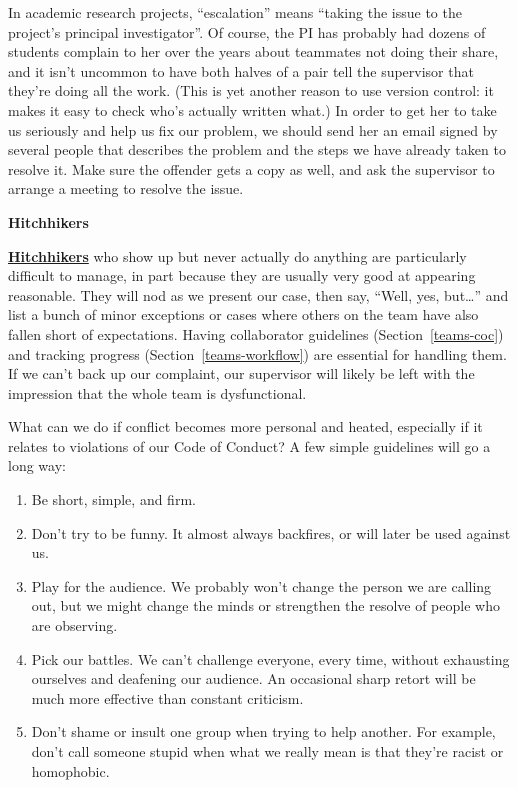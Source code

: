 \documentclass[
]{krantz}
\renewenvironment{quote}{\begin{VF}}{\end{VF}}
\newcommand{\gref}[2]{\hyperlink{#2}{\textbf{#1}}}
\begin{document}
In academic research projects,
``escalation'' means ``taking the issue to the project's principal investigator''.
Of course,
the PI has probably had dozens of students complain to her over the years
about teammates not doing their share,
and it isn't uncommon to have both halves of a pair tell the supervisor that they're doing all the work.
(This is yet another reason to use version control:
it makes it easy to check who's actually written what.)
In order to get her to take us seriously and help us fix our problem,
we should send her an email signed by several people
that describes the problem and the steps we have already taken to resolve it.
Make sure the offender gets a copy as well,
and ask the supervisor to arrange a meeting to resolve the issue.

\begin{quote}
\textbf{Hitchhikers}

\gref{Hitchhikers}{hitchhiker} who show up but never actually do anything
are particularly difficult to manage,
in part because they are usually very good at appearing reasonable.
They will nod as we present our case,
then say, ``Well, yes, but\ldots{}'' and list a bunch of minor exceptions
or cases where others on the team have also fallen short of expectations.
Having collaborator guidelines (Section~\ref{teams-coc})
and tracking progress (Section~\ref{teams-workflow})
are essential for handling them.
If we can't back up our complaint,
our supervisor will likely be left with the impression that the whole team is dysfunctional.
\end{quote}

What can we do if conflict becomes more personal and heated,
especially if it relates to violations of our Code of Conduct?
A few simple guidelines will go a long way:

\begin{enumerate}
\def\labelenumi{\arabic{enumi}.}
\item
  Be short, simple, and firm.
\item
  Don't try to be funny.
  It almost always backfires, or will later be used against us.
\item
  Play for the audience.
  We probably won't change the person we are calling out,
  but we might change the minds or strengthen the resolve of people who are observing.
\item
  Pick our battles.
  We can't challenge everyone, every time,
  without exhausting ourselves and deafening our audience.
  An occasional sharp retort will be much more effective than constant criticism.
\item
  Don't shame or insult one group when trying to help another.
  For example,
  don't call someone stupid
  when what we really mean is that they're racist or homophobic.
\end{enumerate}
\end{document}
